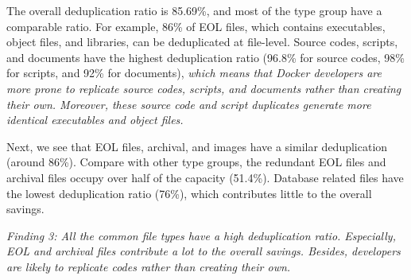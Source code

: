 The overall deduplication ratio is 85.69\%, and most of the type group have a comparable ratio. For example, 86\% of EOL files, which contains executables, object files, and libraries, can be deduplicated at file-level.
Source codes, scripts, and documents have the highest deduplication ratio (96.8\% for source codes, 98\% for scripts, and 92\% for documents), \textit{which means that Docker developers are more prone to replicate source codes, scripts, and documents rather than creating their own. Moreover, these source code and script duplicates generate more identical executables and object files.} 

%

Next, we see that EOL files, archival, and images have a similar deduplication (around 86\%). Compare with other type groups, the redundant EOL files and archival files occupy over half of the capacity (51.4\%). 
Database related files have the lowest deduplication ratio (76\%), which contributes little to the overall savings.

\textit{Finding 3: All the common file types have a high deduplication ratio.
Especially,
EOL and archival files contribute a lot to the overall savings.
Besides, developers are likely to replicate codes rather than creating their own.}

